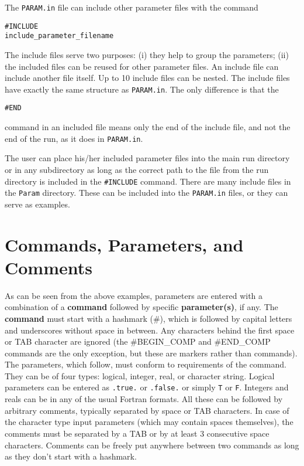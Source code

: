 The {\tt PARAM.in} file can include other parameter files with the 
command
\begin{verbatim}
#INCLUDE
include_parameter_filename
\end{verbatim}
The include files serve two purposes: (i) they help
to group the parameters; (ii) the included files can be reused
for other parameter files. 
An include file can include another file itself.
Up to 10 include files can be nested.
The include files have exactly the same structure as {\tt PARAM.in}. 
The only difference is that the
\begin{verbatim}
#END
\end{verbatim}
command in an included file means only the end of the include file, 
and not the end of the run, as it does in {\tt PARAM.in}.

The user can place his/her
included parameter files into the main run directory or in any subdirectory
as long as the correct path to the file from the run directory is
included in the {\tt \#INCLUDE} command.
There are many include files in the {\tt Param} directory. These
can be included into the {\tt PARAM.in} files, or they can serve as
examples. 

\section{Commands, Parameters, and Comments \label{section:commands}}

As can be seen from the above examples,  parameters are entered
with a combination of a {\bf command} followed by specific {\bf parameter(s)},
if any.
The {\bf command} must start with a hashmark (\#), which 
is followed by capital letters and underscores without space in between. 
Any characters behind the first space or TAB character are ignored
(the \#BEGIN\_COMP and \#END\_COMP commands are the only exception,
but these are markers rather than commands).
The parameters, which follow, must conform to 
requirements of the command. They can be of four types: logical, integer,
real, or character string. Logical parameters can be entered as 
{\tt .true.} or {\tt .false.} or simply {\tt T} or {\tt F}.
Integers and reals can be in any of the usual Fortran formats.
All these can be followed by arbitrary comments, typically separated
by space or TAB characters. In case of the character type input
parameters (which may contain spaces themselves), the comments must
be separated by a TAB or by at least 3 consecutive space characters.
Comments can be freely put anywhere between two commands as long
as they don't start with a hashmark.

